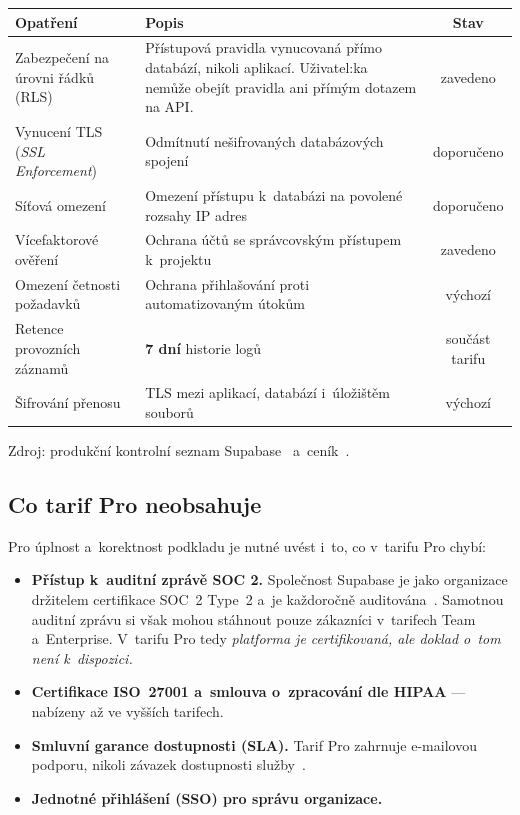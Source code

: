 \documentclass[11pt,a4paper]{article}
\newcommand{\ano}{\textcolor{accent}{\ding{51}}}
\begin{document}
\begin{center}
\begin{tabularx}{\textwidth}{@{}p{4.6cm}Xc@{}}
\toprule
\textbf{Opatření} & \textbf{Popis} & \textbf{Stav} \\
\midrule
Zabezpečení na úrovni řádků (RLS) & Přístupová pravidla vynucovaná přímo databází, nikoli aplikací. Uživatel:ka nemůže obejít pravidla ani přímým dotazem na API. & \ano zavedeno \\
Vynucení TLS (\emph{SSL Enforcement}) & Odmítnutí nešifrovaných databázových spojení & doporučeno \\
Síťová omezení & Omezení přístupu k~databázi na povolené rozsahy IP adres & doporučeno \\
Vícefaktorové ověření & Ochrana účtů se správcovským přístupem k~projektu & \ano zavedeno \\
Omezení četnosti požadavků & Ochrana přihlašování proti automatizovaným útokům & \ano výchozí \\
Retence provozních záznamů & \textbf{7 dní} historie logů & součást tarifu \\
Šifrování přenosu & TLS mezi aplikací, databází i~úložištěm souborů & \ano výchozí \\
\bottomrule
\end{tabularx}
\end{center}

Zdroj: produkční kontrolní seznam Supabase~\cite{prodchecklist} a~ceník~\cite{cenik}.

\subsection{Co tarif Pro neobsahuje}

Pro úplnost a~korektnost podkladu je nutné uvést i~to, co v~tarifu Pro chybí:

\begin{itemize}
  \item \textbf{Přístup k~auditní zprávě SOC 2.} Společnost Supabase je jako organizace držitelem
        certifikace SOC~2 Type~2 a~je každoročně auditována~\cite{soc2}. Samotnou auditní zprávu
        si však mohou stáhnout pouze zákazníci v~tarifech Team a~Enterprise. V~tarifu Pro tedy
        \emph{platforma je certifikovaná, ale doklad o~tom není k~dispozici.}
  \item \textbf{Certifikace ISO~27001 a~smlouva o~zpracování dle HIPAA} --- nabízeny až ve vyšších
        tarifech.
  \item \textbf{Smluvní garance dostupnosti (SLA).} Tarif Pro zahrnuje e-mailovou podporu, nikoli
        závazek dostupnosti služby~\cite{cenik}.
  \item \textbf{Jednotné přihlášení (SSO) pro správu organizace.}
\end{itemize}
\end{document}
